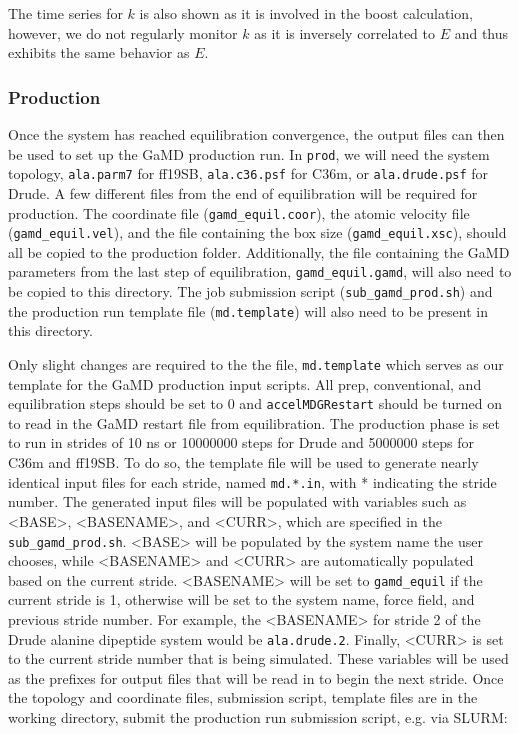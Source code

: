 \documentclass[9pt,tutorial]{livecoms}
\begin{document}
The time series for $k$ is also shown as it is involved in the boost calculation, however, we do not regularly monitor $k$ as it is inversely correlated to $E$ and thus exhibits the same behavior as $E$.

\subsubsection{Production} \label{ss:tutorial_prod}
Once the system has reached equilibration convergence, the output files can then be used to set up the GaMD production run. In \texttt{prod}, we will need the system topology, \texttt{ala.parm7} for ff19SB, \texttt{ala.c36.psf} for C36m, or \texttt{ala.drude.psf} for Drude. A few different files from the end of equilibration will be required for production. The coordinate file (\texttt{gamd\_equil.coor}), the atomic velocity file (\texttt{gamd\_equil.vel}), and the file containing the box size (\texttt{gamd\_equil.xsc}), should all be copied to the production folder. Additionally, the file containing the GaMD parameters from the last step of equilibration, \texttt{gamd\_equil.gamd}, will also need to be copied to this directory. The job submission script  (\texttt{sub\_gamd\_prod.sh}) and the production run template file (\texttt{md.template}) will also need to be present in this directory. 

Only slight changes are required to the the file, \texttt{md.template} which serves as our template for the GaMD production input scripts. All prep, conventional, and equilibration steps should be set to 0 and \texttt{accelMDGRestart} should be turned on to read in the GaMD restart file from equilibration. The production phase is set to run in strides of 10 ns or 10000000 steps for Drude and 5000000 steps for C36m and ff19SB. To do so, the template file will be used to generate nearly identical input files for each stride, named \texttt{md.*.in}, with * indicating the stride number. The generated input files will be populated with variables such as <BASE>, <BASENAME>, and <CURR>, which are specified in the \texttt{sub\_gamd\_prod.sh}. <BASE> will be populated by the system name the user chooses, while <BASENAME> and <CURR> are automatically populated based on the current stride. <BASENAME> will be set to \texttt{gamd\_equil} if the current stride is 1, otherwise will be set to the system name, force field, and previous stride number. For example, the <BASENAME> for stride 2 of the Drude alanine dipeptide system would be \texttt{ala.drude.2}. Finally, <CURR> is set to the current stride number that is being simulated. These variables will be used as the prefixes for output files that will be read in to begin the next stride. Once the topology and coordinate files, submission script,  template files are in the working directory, submit the production run submission script, e.g. via SLURM:
\end{document}
